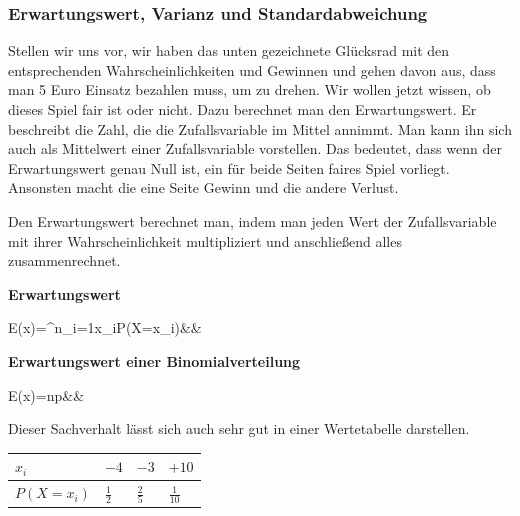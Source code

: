 \documentclass[12pt]{article}
\begin{document}
			\subsubsection{Erwartungswert, Varianz und Standardabweichung}
				Stellen wir uns vor, wir haben das unten gezeichnete Glücksrad mit den entsprechenden Wahrscheinlichkeiten und Gewinnen und gehen davon aus, dass man 5 Euro Einsatz bezahlen muss, um zu drehen. Wir wollen jetzt wissen, ob dieses Spiel fair ist oder nicht. Dazu berechnet man den Erwartungswert. Er beschreibt die Zahl, die die Zufallsvariable im Mittel annimmt. Man kann ihn sich auch als Mittelwert einer Zufallsvariable vorstellen. Das bedeutet, dass wenn der Erwartungswert genau Null ist, ein für beide Seiten faires Spiel vorliegt. Ansonsten macht die eine Seite Gewinn und die andere Verlust.
				\begin{center}
				\end{center}
				Den Erwartungswert berechnet man, indem man jeden Wert der Zufallsvariable mit ihrer Wahrscheinlichkeit multipliziert und anschließend alles zusammenrechnet.
				\begin{tcolorbox}[boxsep=0pt,top=.75cm,left=.75cm,right=.75cm, bottom=.75cm,arc=0pt,auto outer arc,colback=white,colframe=gray, enlarge top by=.5cm, enlarge bottom by=.5cm]
					\textbf{Erwartungswert}
					\begin{flalign*}
						E(x)=\sum^n_{i=1}x_i\cdot P(X=x_i)\mu{}&&
					\end{flalign*}
					\textbf{Erwartungswert einer Binomialverteilung}
					\begin{flalign*}
					E(x)=np&&
					\end{flalign*}
				\end{tcolorbox}
				\noindent Dieser Sachverhalt lässt sich auch sehr gut in einer Wertetabelle darstellen.
				\begin{center}
					\bgroup
					\def\arraystretch{1.5}
					\begin{tabularx}{\linewidth}{|l|@{\hspace{0.5cm}}|X|X|X|}
						\hline
						$x_i$ & $-4$ & $-3$ & $+10$ \\ \hline
						$P(X=x_i)$ & $\frac{1}{2}$ & $\frac{2}{5}$ & $\frac{1}{10}$ \\ \hline
					\end{tabularx}
					\egroup
				\end{center}
\end{document}

